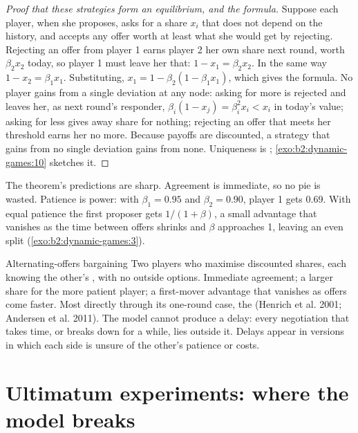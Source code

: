 \begin{proof}[Proof that these strategies form an equilibrium, and the formula]
Suppose each player, when she proposes, asks for a share $x_i$ that does not depend on the history, and accepts
any offer worth at least what she would get by rejecting. Rejecting an offer from player 1 earns player 2 her
own share next round, worth $\beta_2 x_2$ today, so player 1 must leave her that: $1 - x_1 = \beta_2 x_2$. In the same
way $1 - x_2 = \beta_1 x_1$. Substituting, $x_1 = 1 - \beta_2(1 - \beta_1 x_1)$, which gives the formula. No player gains
from a single deviation at any node: asking for more is rejected and leaves her, as next round's responder,
$\beta_i(1 - x_j) = \beta_i^2 x_i < x_i$ in today's value; asking for less gives away share for nothing; rejecting an
offer that meets her threshold earns her no more. Because payoffs are discounted, a strategy that gains from no
single deviation gains from none. Uniqueness is \admitted; \cref{exo:b2:dynamic-games:10} sketches it.
\end{proof}

The theorem's predictions are sharp. Agreement is immediate, so no pie is wasted. Patience is power: with
$\beta_1 = 0.95$ and $\beta_2 = 0.90$, player 1 gets 0.69. With equal patience the first proposer gets $1/(1 + \beta)$, a
small advantage that vanishes as the time between offers shrinks and $\beta$ approaches 1, leaving an even
split (\cref{exo:b2:dynamic-games:3}).

\begin{model}{Alternating-offers bargaining}
\assumes Two players who maximise discounted shares, each knowing the other's , with no
outside options.
\predicts Immediate agreement; a larger share for the more patient player; a first-mover advantage that
vanishes as offers come faster.
\tested Most directly through its one-round case, the  (Henrich et al. 2001; Andersen et al.
2011).
\breaks The model cannot produce a delay: every negotiation that takes time, or breaks down for a while,
lies outside it. Delays appear in versions in which each side is unsure of the other's patience or costs.
\end{model}

\section{Ultimatum experiments: where the model breaks}\label{sec:b2:dynamic-games:ultimatum}

